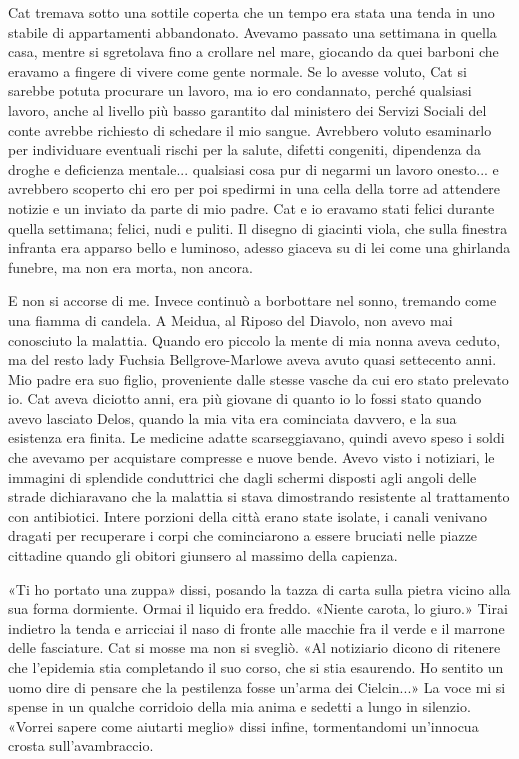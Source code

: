 Cat tremava sotto una sottile coperta che un tempo era stata una tenda
in uno stabile di appartamenti abbandonato. Avevamo passato una
settimana in quella casa, mentre si sgretolava fino a crollare nel mare,
giocando da quei barboni che eravamo a fingere di vivere come gente
normale. Se lo avesse voluto, Cat si sarebbe potuta procurare un lavoro,
ma io ero condannato, perché qualsiasi lavoro, anche al livello più
basso garantito dal ministero dei Servizi Sociali del conte avrebbe
richiesto di schedare il mio sangue. Avrebbero voluto esaminarlo per
individuare eventuali rischi per la salute, difetti congeniti,
dipendenza da droghe e deficienza mentale... qualsiasi cosa pur di
negarmi un lavoro onesto... e avrebbero scoperto chi ero per poi
spedirmi in una cella della torre ad attendere notizie e un inviato da
parte di mio padre. Cat e io eravamo stati felici durante quella
settimana; felici, nudi e puliti. Il disegno di giacinti viola, che
sulla finestra infranta era apparso bello e luminoso, adesso giaceva su
di lei come una ghirlanda funebre, ma non era morta, non ancora.

E non si accorse di me. Invece continuò a borbottare nel sonno, tremando
come una fiamma di candela. A Meidua, al Riposo del Diavolo, non avevo
mai conosciuto la malattia. Quando ero piccolo la mente di mia nonna
aveva ceduto, ma del resto lady Fuchsia Bellgrove-Marlowe aveva avuto
quasi settecento anni. Mio padre era suo figlio, proveniente dalle
stesse vasche da cui ero stato prelevato io. Cat aveva diciotto anni,
era più giovane di quanto io lo fossi stato quando avevo lasciato Delos,
quando la mia vita era cominciata davvero, e la sua esistenza era
finita. Le medicine {adatte} scarseggiavano, quindi avevo speso i soldi
che avevamo per acquistare compresse e nuove bende. Avevo visto i
notiziari, le immagini di splendide conduttrici che dagli schermi
disposti agli angoli delle strade dichiaravano che la malattia si stava
dimostrando resistente al trattamento con antibiotici. Intere porzioni
della città erano state isolate, i canali venivano dragati per
recuperare i corpi che cominciarono a essere bruciati nelle piazze
cittadine quando gli obitori giunsero al massimo della capienza.

«Ti ho portato una zuppa» dissi, posando la tazza di carta sulla pietra
vicino alla sua forma dormiente. Ormai il liquido era freddo. «Niente
carota, lo giuro.» Tirai indietro la tenda e arricciai il naso di fronte
alle macchie fra il verde e il marrone delle fasciature. Cat si mosse ma
non si svegliò. «Al notiziario dicono di ritenere che l'epidemia stia
completando il suo corso, che si stia esaurendo. Ho sentito un uomo dire
di pensare che la pestilenza fosse un'arma dei Cielcin...» La voce mi si
spense in un qualche corridoio della mia anima e sedetti a lungo in
silenzio. «Vorrei sapere come aiutarti meglio» dissi infine,
tormentandomi un'innocua crosta sull'avambraccio.


